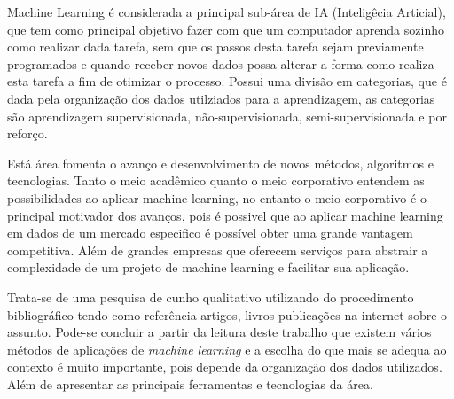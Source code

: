 Machine Learning é considerada a principal sub-área de IA (Inteligêcia Articial), que tem como principal objetivo fazer com 
que um computador aprenda sozinho como realizar dada tarefa, sem que os passos desta tarefa sejam previamente programados e
quando receber novos dados possa alterar a forma como realiza esta tarefa a fim de otimizar o processo. Possui uma divisão
em categorias, que é dada pela organização dos dados utilziados para a aprendizagem, as categorias são aprendizagem supervisionada, não-supervisionada, 
semi-supervisionada e por reforço.   


Está área fomenta o avanço e desenvolvimento de novos métodos, algoritmos e tecnologias. Tanto o meio acadêmico quanto o meio 
corporativo entendem as possibilidades ao aplicar machine learning, no entanto o meio corporativo é o principal motivador 
dos avanços, pois é possivel que ao aplicar machine learning em dados de um mercado especifico é possível obter uma grande
vantagem competitiva. Além de grandes empresas que oferecem serviços para abstrair a complexidade de um projeto de 
machine learning e facilitar sua aplicação. 

Trata-se de uma pesquisa de cunho qualitativo utilizando do procedimento
bibliográfico tendo como referência artigos, livros publicações na internet sobre o assunto. Pode-se concluir a partir da 
leitura deste trabalho que existem vários métodos de aplicações de \textit{machine learning} e a escolha do que mais 
se adequa ao contexto é muito importante, pois depende da organização dos dados utilizados. 
Além de apresentar as principais ferramentas e tecnologias da área.   



